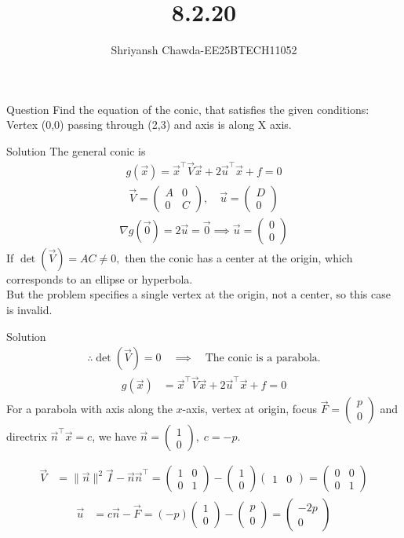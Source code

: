 \documentclass{beamer}
\title{8.2.20}
\author{Shriyansh Chawda-EE25BTECH11052}
\newcommand{\myvec}[1]{\ensuremath{\begin{pmatrix}#1\end{pmatrix}}}
\begin{document}
\frame{\titlepage}
	
\begin{frame}{Question} 
Find the equation of the conic, that satisfies the given
conditions:\\
Vertex (0,0) passing through (2,3) and axis is along X axis.
\end{frame}
	
\begin{frame}{Solution}
The general conic is 
\begin{align}
	g(\vec{x}) = \vec{x}^\top \vec{V}\vec{x} + 2\vec{u}^\top \vec{x} + f = 0
\end{align}
\begin{align}
	\vec{V} = \myvec{A & 0 \\ 0 & C}, \quad 
	\vec{u} = \myvec{D \\ 0}
\end{align}
\begin{align}
	\nabla g(\vec{0}) = 2\vec{u} = \vec{0} 
	\implies \vec{u} = \myvec{0 \\ 0}
\end{align}
If $ \det(\vec{V}) = AC \neq 0,$ then the conic has a center at the origin, which corresponds to an ellipse or hyperbola.\\
But the problem specifies a single vertex at the origin, not a center, so this case is invalid.
\end{frame}



\begin{frame}{Solution}
\begin{align}
	\therefore \det(\vec{V}) = 0 \quad \implies \quad \text{The conic is a parabola.}
\end{align}
\begin{align}
	g(\vec{x}) &= \vec{x}^\top \vec{V}\vec{x} + 2\vec{u}^\top \vec{x} + f = 0 
\end{align}
For a parabola with axis along the $x$-axis, vertex at origin,  
focus $\vec{F} = \myvec{p \\ 0}$ and directrix $\vec{n}^\top \vec{x} = c$,  
we have $\vec{n} = \myvec{1 \\ 0}, \; c = -p$.

\begin{align}
	\vec{V} &= \|\vec{n}\|^2 \vec{I} - \vec{n}\vec{n}^\top 
	= \myvec{1 & 0 \\ 0 & 1} - \myvec{1 \\ 0}\myvec{1 & 0} 
	= \myvec{0 & 0 \\ 0 & 1}
\end{align}
\begin{align}
	\vec{u} &= c\vec{n} - \vec{F} 
	= (-p)\myvec{1 \\ 0} - \myvec{p \\ 0} 
	= \myvec{-2p \\ 0}
\end{align}	
\end{frame}
\end{document}
